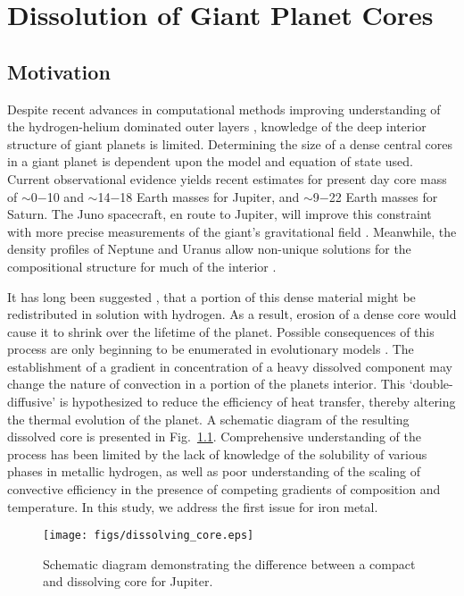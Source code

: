 \chapter{Dissolution of Giant Planet Cores}\label{chap5}

\section{Motivation}

Despite recent advances in computational methods improving understanding of
the hydrogen-helium dominated outer layers
\citep{mcmahon12,french12,militzer13,wilson10}, knowledge of the deep interior structure
of giant planets is limited.
Determining the size of a dense central cores in a giant planet is dependent upon
the model and equation of state used.
Current observational evidence yields recent estimates for present day core
mass of
$\sim$0$-$10 \citep{guillot05} and $\sim$14$-$18 \citep{militzer08} Earth masses for Jupiter, and
$\sim$9$-$22 \citep{guillot05} Earth masses for Saturn.
The Juno spacecraft, en route to Jupiter, will improve this constraint with more 
precise measurements of the giant's gravitational field \citep{helled11}. 
Meanwhile, the density profiles of Neptune and Uranus allow non-unique solutions 
for the compositional structure for much of the interior
\citep{guillot99b,guillot05}.

It has long been suggested \citep{stevenson82a,stevenson82b}, that a portion of
this dense material might be redistributed in solution with hydrogen. As a
result, erosion of a dense core would cause it to shrink over the lifetime of
the planet. Possible consequences of this process are only beginning to be
enumerated in evolutionary models \citep{chabrier07,leconte12,mirouh12}. The
establishment of a gradient in concentration of a heavy dissolved component may
change the nature of convection in a portion of the planets interior. This
`double-diffusive' is hypothesized to reduce the efficiency of heat transfer,
thereby altering the thermal evolution of the planet. A schematic diagram of
the resulting dissolved core is presented in Fig.~\ref{fig:dissolve_core}.
Comprehensive understanding of the process has been limited by the lack of
knowledge of the solubility of various phases in metallic hydrogen, as well as
poor understanding of the scaling of convective efficiency in the presence of
competing gradients of composition and temperature. In this study, we address
the first issue for iron metal.

 \begin{figure}[!h] %
   \centering
   \texttt{[image: figs/dissolving\_core.eps]} 
   \caption{Schematic diagram demonstrating the difference between a compact and dissolving core for Jupiter.\label{fig:dissolve_core}}
\end{figure}



